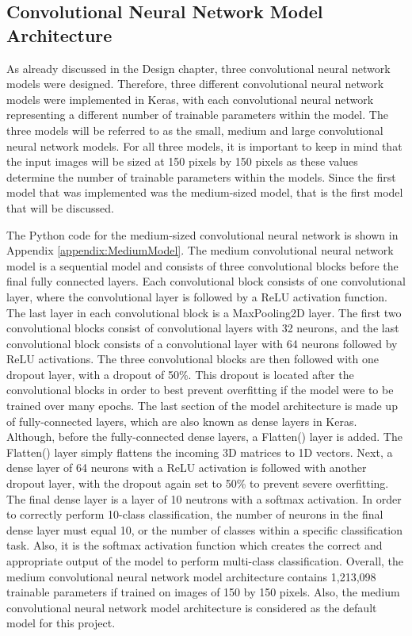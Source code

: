 \documentclass{l4proj}
\begin{document}
\subsection{Convolutional Neural Network Model Architecture}
As already discussed in the Design chapter, three convolutional neural network models were designed.
Therefore, three different convolutional neural network models were implemented in Keras, with each convolutional neural network representing a different number of trainable parameters within the model.
The three models will be referred to as the small, medium and large convolutional neural network models.
For all three models, it is important to keep in mind that the input images will be sized at 150 pixels by 150 pixels as these values determine the number of trainable parameters within the models. 
Since the first model that was implemented was the medium-sized model, that is the first model that will be discussed.

The Python code for the medium-sized convolutional neural network is shown in Appendix \ref{appendix:MediumModel}.
The medium convolutional neural network model is a sequential model and consists of three convolutional blocks before the final fully connected layers.
Each convolutional block consists of one convolutional layer, where the convolutional layer is followed by a ReLU activation function.
The last layer in each convolutional block is a MaxPooling2D layer.
The first two convolutional blocks consist of convolutional layers with 32 neurons, and the last convolutional block consists of a convolutional layer with 64 neurons followed by ReLU activations.
The three convolutional blocks are then followed with one dropout layer, with a dropout of 50\%. This dropout is located after the convolutional blocks in order to best prevent overfitting if the model were to be trained over many epochs.
The last section of the model architecture is made up of fully-connected layers, which are also known as dense layers in Keras.
Although, before the fully-connected dense layers, a Flatten() layer is added.
The Flatten() layer simply flattens the incoming 3D matrices to 1D vectors.
Next, a dense layer of 64 neurons with a ReLU activation is followed with another dropout layer, with the dropout again set to 50\% to prevent severe overfitting.
The final dense layer is a layer of 10 neutrons with a softmax activation.
In order to correctly perform 10-class classification, the number of neurons in the final dense layer must equal 10, or the number of classes within a specific classification task.
Also, it is the softmax activation function which creates the correct and appropriate output of the model to perform multi-class classification.
Overall, the medium convolutional neural network model architecture contains 1,213,098 trainable parameters if trained on images of 150 by 150 pixels.
Also, the medium convolutional neural network model architecture is considered as the default model for this project.
\end{document}
